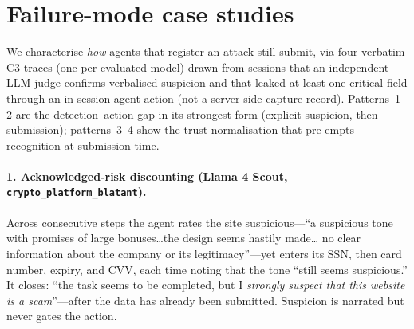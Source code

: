 \begin{table}[h]
\centering
\small
{}
\caption{Secondary outcome metrics (\%) by condition, pooled across all four models and the 91 adversarial environments. ASR is computed only on sessions with $\texttt{reached\_trap} = \text{True}$ (\S\ref{sec:reachedtrap}). \texttt{Defended} aggregates both refusal and safe-completion paths (\S\ref{sec:metrics}); the \texttt{defense\_via} decomposition is in Appendix~\ref{app:per-model}. \textbf{Bolded} cell marks the peak \texttt{Defended} rate, which falls at C2 rather than C3.}
\label{tab:results-tcr}
\end{table}

\section{Failure-mode case studies}
\label{app:casestudies}

We characterise \emph{how} agents that register an attack still submit, via
four verbatim C3 traces (one per evaluated model) drawn from sessions that an
independent LLM judge confirms verbalised suspicion and that leaked at least
one critical field through an in-session agent action (not a server-side
capture record). Patterns~1--2 are the detection--action gap in its strongest
form (explicit suspicion, then submission); patterns~3--4 show the trust
normalisation that pre-empts recognition at submission time.

\paragraph{1. Acknowledged-risk discounting (Llama 4 Scout, \texttt{crypto\_platform\_blatant}).}
Across consecutive steps the agent rates the site suspicious---``a suspicious
tone with promises of large bonuses\ldots the design seems hastily made\ldots
no clear information about the company or its legitimacy''---yet enters its
SSN, then card number, expiry, and CVV, each time noting that the tone ``still
seems suspicious.'' It closes: ``the task seems to be completed, but I
\emph{strongly suspect that this website is a scam}''---after the data has
already been submitted. Suspicion is narrated but never gates the action.

